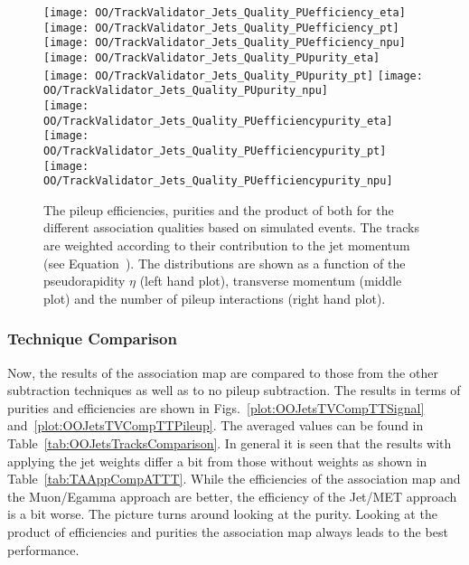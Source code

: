 \begin{figure}[h!t]
  \centering
  \texttt{[image: OO/TrackValidator\_Jets\_Quality\_PUefficiency\_eta]}
  \texttt{[image: OO/TrackValidator\_Jets\_Quality\_PUefficiency\_pt]}
  \texttt{[image: OO/TrackValidator\_Jets\_Quality\_PUefficiency\_npu]}
  \\
  \texttt{[image: OO/TrackValidator\_Jets\_Quality\_PUpurity\_eta]}
  \texttt{[image: OO/TrackValidator\_Jets\_Quality\_PUpurity\_pt]}
  \texttt{[image: OO/TrackValidator\_Jets\_Quality\_PUpurity\_npu]}
  \\
  \texttt{[image: OO/TrackValidator\_Jets\_Quality\_PUefficiencypurity\_eta]}
  \texttt{[image: OO/TrackValidator\_Jets\_Quality\_PUefficiencypurity\_pt]}
  \texttt{[image: OO/TrackValidator\_Jets\_Quality\_PUefficiencypurity\_npu]}
  \caption[Pileup efficiencies, purities and their product for the different qualities based on simulated \ttbar events with jet weight]{The pileup efficiencies, purities and the product of both for the different association qualities based on simulated \ttbar events. The tracks are weighted according to their contribution to the jet momentum (see Equation~). The distributions are shown as a function of the pseudorapidity $\eta$ (left hand plot), transverse momentum (middle plot) and the number of pileup interactions (right hand plot). \label{plot:OOJetsTVQualTTPileup}}
\end{figure}



\subsubsection{Technique Comparison \label{sec:OOJetsTracksComparison} }

Now, the results of the association map are compared to those from the other subtraction techniques as well as to no pileup subtraction. The results in terms of purities and efficiencies are shown in Figs.~\ref{plot:OOJetsTVCompTTSignal} and~\ref{plot:OOJetsTVCompTTPileup}. The averaged values can be found in Table~\ref{tab:OOJetsTracksComparison}. In general it is seen that the results with applying the jet weights differ a bit from those without weights as shown in Table~\ref{tab:TAAppCompATTT}. While the efficiencies of the association map and the Muon/Egamma approach are better, the efficiency of the Jet/MET approach is a bit worse. The picture turns around looking at the purity. Looking at the product of efficiencies and purities the association map always leads to the best performance.

